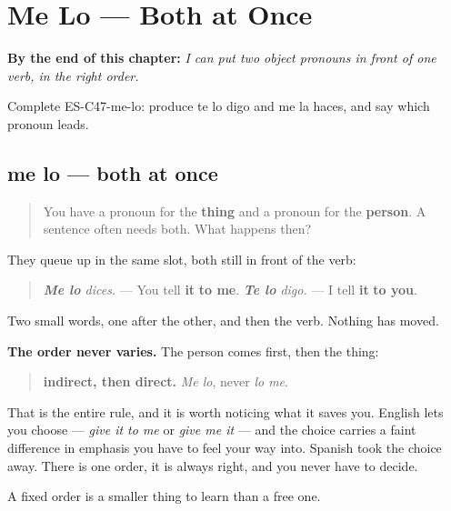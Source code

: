 
\chapter{Me Lo --- Both at Once}
\label{ch:double-object-order}

\begin{chapteropening}
\textbf{By the end of this chapter:} \emph{I can put two object pronouns in front of one verb, in the right order.}

Complete ES-C47-me-lo: produce te lo digo and me la haces, and say which pronoun leads.
\end{chapteropening}

\section[me lo]{me lo — both at once}

\label{lesson:ES-C47-me-lo}



\begin{quote}
You have a pronoun for the \textbf{thing} and a pronoun for the \textbf{person}. A sentence often needs both. What happens then?
\end{quote}

\begin{grammarlens}[title={Grammar Lens: they stand together, in one order}]
They queue up in the same slot, both still in front of the verb:

\begin{quote}
\emph{\textbf{Me lo} dices.} — You tell \textbf{it} \textbf{to me}. \emph{\textbf{Te lo} digo.} — I tell \textbf{it} \textbf{to you}.
\end{quote}

Two small words, one after the other, and then the verb. Nothing has moved.

\textbf{The order never varies.} The person comes first, then the thing:

\begin{quote}
\textbf{indirect, then direct.} \emph{Me lo}, never \emph{lo me}.
\end{quote}

That is the entire rule, and it is worth noticing what it saves you. English lets you choose — \emph{give it to me} or \emph{give me it} — and the choice carries a faint difference in emphasis you have to feel your way into. Spanish took the choice away. There is one order, it is always right, and you never have to decide.

A fixed order is a smaller thing to learn than a free one.
\end{grammarlens}

